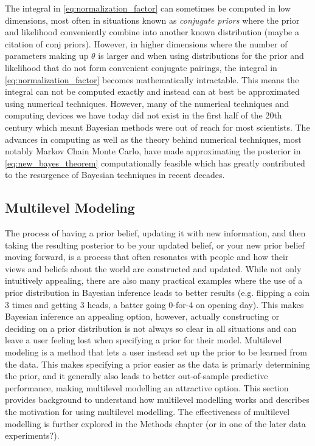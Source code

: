 The integral in \ref{eq:normalization_factor} can sometimes be computed in low dimensions, most often in situations known as \textit{conjugate priors} where the prior and likelihood conveniently combine into another known distribution (maybe a citation of conj priors). However, in higher dimensions where the number of parameters making up $\theta$ is larger and when using distributions for the prior and likelihood that do not form convenient conjugate pairings, the integral in \ref{eq:normalization_factor} becomes mathematically intractable. This means the integral can not be computed exactly and instead can at best be approximated using numerical techniques. However, many of the numerical techniques and computing devices we have today did not exist in the first half of the 20th century which meant Bayesian methods were out of reach for most scientists. The advances in computing as well as the theory behind numerical techniques, most notably Markov Chain Monte Carlo, have made approximating the posterior in \ref{eq:new_bayes_theorem} computationally feasible which has greatly contributed to the resurgence of Bayesian techniques in recent decades.

\subsection{Multilevel Modeling}

The process of having a prior belief, updating it with new information, and then taking the resulting posterior to be your updated belief, or your new prior belief moving forward, is a process that often resonates with people and how their views and beliefs about the world are constructed and updated. While not only intuitively appealing, there are also many practical examples where the use of a prior distribution in Bayesian inference leads to better results (e.g. flipping a coin 3 times and getting 3 heads, a batter going 0-for-4 on opening day). This makes Bayesian inference an appealing option, however, actually constructing or deciding on a prior distribution is not always so clear in all situations and can leave a user feeling lost when specifying a prior for their model. Multilevel modeling is a method that lets a user instead set up the prior to be learned from the data. This makes specifying a prior easier as the data is primarly determining the prior, and it generally also leads to better out-of-sample predictive performance, making multilevel modelling an attractive option. This section provides background to understand how multilevel modelling works and describes the motivation for using multilevel modelling. The effectiveness of multilevel modelling is further explored in the Methods chapter (or in one of the later data experiments?).

